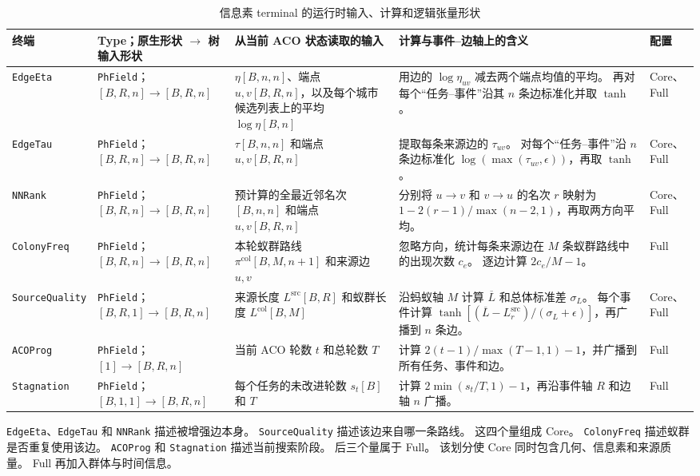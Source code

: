 \documentclass[letterpaper,journal]{IEEEtran}
\begin{document}
\begin{table}[t]
\caption{信息素 terminal 的运行时输入、计算和逻辑张量形状}
\label{tab:pheromone-terminals-zh}
\centering
\scriptsize
\renewcommand{\arraystretch}{1.18}
\setlength{\tabcolsep}{2.5pt}
\begin{tabular}{L{19mm}L{28mm}L{49mm}L{62mm}L{14mm}}
\toprule
终端 & Type；原生形状 \(\to\) 树输入形状 &
从当前 ACO 状态读取的输入 & 计算与事件--边轴上的含义 & 配置\\
\midrule
\texttt{EdgeEta} &
\texttt{PhField}；\([B,R,n]\to[B,R,n]\) &
\(\eta[B,n,n]\)、端点 \(u,v[B,R,n]\)，以及每个城市候选列表上的平均
\(\log\eta[B,n]\) &
用边的 \(\log\eta_{uv}\) 减去两个端点均值的平均。
再对每个“任务--事件”沿其 \(n\) 条边标准化并取 \(\tanh\)。 &
Core、Full\\
\texttt{EdgeTau} &
\texttt{PhField}；\([B,R,n]\to[B,R,n]\) &
\(\tau[B,n,n]\) 和端点 \(u,v[B,R,n]\) &
提取每条来源边的 \(\tau_{uv}\)。
对每个“任务--事件”沿 \(n\) 条边标准化
\(\log(\max(\tau_{uv},\epsilon))\)，再取 \(\tanh\)。 &
Core、Full\\
\texttt{NNRank} &
\texttt{PhField}；\([B,R,n]\to[B,R,n]\) &
预计算的全最近邻名次 \([B,n,n]\) 和端点 \(u,v[B,R,n]\) &
分别将 \(u\!\to\!v\) 和 \(v\!\to\!u\) 的名次 \(r\) 映射为
\(1-2(r-1)/\max(n-2,1)\)，再取两方向平均。 &
Core、Full\\
\texttt{ColonyFreq} &
\texttt{PhField}；\([B,R,n]\to[B,R,n]\) &
本轮蚁群路线 \(\pi^{\mathrm{col}}[B,M,n+1]\) 和来源边 \(u,v\) &
忽略方向，统计每条来源边在 \(M\) 条蚁群路线中的出现次数 \(c_e\)。
逐边计算 \(2c_e/M-1\)。 &
Full\\
\texttt{SourceQuality} &
\texttt{PhField}；\([B,R,1]\to[B,R,n]\) &
来源长度 \(L^{\mathrm{src}}[B,R]\) 和蚁群长度
\(L^{\mathrm{col}}[B,M]\) &
沿蚂蚁轴 \(M\) 计算 \(\overline L\) 和总体标准差 \(\sigma_L\)。
每个事件计算
\(\tanh[(\overline L-L^{\mathrm{src}}_r)/(\sigma_L+\epsilon)]\)，再广播到 \(n\) 条边。 &
Core、Full\\
\texttt{ACOProg} &
\texttt{PhField}；\([1]\to[B,R,n]\) &
当前 ACO 轮数 \(t\) 和总轮数 \(T\) &
计算 \(2(t-1)/\max(T-1,1)-1\)，并广播到所有任务、事件和边。 &
Full\\
\texttt{Stagnation} &
\texttt{PhField}；\([B,1,1]\to[B,R,n]\) &
每个任务的未改进轮数 \(s_t[B]\) 和 \(T\) &
计算 \(2\min(s_t/T,1)-1\)，再沿事件轴 \(R\) 和边轴 \(n\) 广播。 &
Full\\
\bottomrule
\end{tabular}
\end{table}

\texttt{EdgeEta}、\texttt{EdgeTau} 和 \texttt{NNRank} 描述被增强边本身。
\texttt{SourceQuality} 描述该边来自哪一条路线。
这四个量组成 Core。
\texttt{ColonyFreq} 描述蚁群是否重复使用该边。
\texttt{ACOProg} 和 \texttt{Stagnation} 描述当前搜索阶段。
后三个量属于 Full。
该划分使 Core 同时包含几何、信息素和来源质量。
Full 再加入群体与时间信息。
\end{document}

